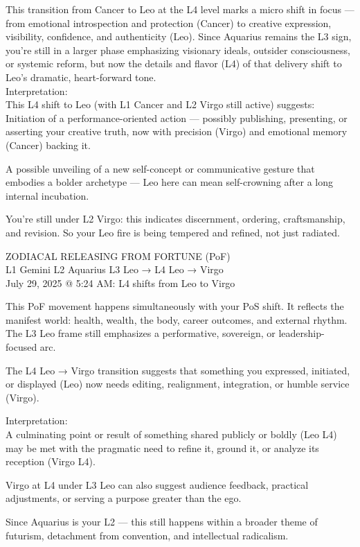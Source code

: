 \documentclass{article}
\begin{document}
This transition from Cancer to Leo at the L4 level marks a micro shift
in focus --- from emotional introspection and protection (Cancer) to
creative expression, visibility, confidence, and authenticity (Leo).
Since Aquarius remains the L3 sign, you're still in a larger phase
emphasizing visionary ideals, outsider consciousness, or systemic
reform, but now the details and flavor (L4) of that delivery shift to
Leo's dramatic, heart-forward tone.\\
Interpretation:\\
This L4 shift to Leo (with L1 Cancer and L2 Virgo still active)
suggests:\\
Initiation of a performance-oriented action --- possibly publishing,
presenting, or asserting your creative truth, now with precision (Virgo)
and emotional memory (Cancer) backing it.

A possible unveiling of a new self-concept or communicative gesture that
embodies a bolder archetype --- Leo here can mean self-crowning after a
long internal incubation.

You're still under L2 Virgo: this indicates discernment, ordering,
craftsmanship, and revision. So your Leo fire is being tempered and
refined, not just radiated.

 ZODIACAL RELEASING FROM FORTUNE (PoF)\\
L1 Gemini \textbar{} L2 Aquarius \textbar{} L3 Leo → L4 Leo → Virgo\\
July 29, 2025 @ 5:24 AM: L4 shifts from Leo to Virgo

This PoF movement happens simultaneously with your PoS shift. It
reflects the manifest world: health, wealth, the body, career outcomes,
and external rhythm.\\
The L3 Leo frame still emphasizes a performative, sovereign, or
leadership-focused arc.

The L4 Leo → Virgo transition suggests that something you expressed,
initiated, or displayed (Leo) now needs editing, realignment,
integration, or humble service (Virgo).

Interpretation:\\
A culminating point or result of something shared publicly or boldly
(Leo L4) may be met with the pragmatic need to refine it, ground it, or
analyze its reception (Virgo L4).

Virgo at L4 under L3 Leo can also suggest audience feedback, practical
adjustments, or serving a purpose greater than the ego.

Since Aquarius is your L2 --- this still happens within a broader theme
of futurism, detachment from convention, and intellectual radicalism.
\end{document}
